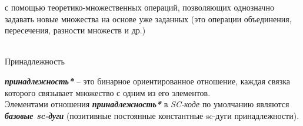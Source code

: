 \begin{frame}%
	
	\begin{textitemize}
	\item с помощью теоретико-множественных операций, позволяющих однозначно задавать новые множества на основе уже заданных (это операции объединения, пересечения, разности множеств и др.)
	\end{textitemize}

\vspace{2em}


\vspace{0.2em}
 

 
    
	\vspace{-4em}
\end{frame}

\begin{frame}{\\Принадлежность}
	\topline
	\justifying
	\begin{SCn}
	\end{SCn}
	
	\textbf{\textit{принадлежность*}} -- это бинарное ориентированное отношение, каждая связка которого связывает множество с одним из его элементов.\\
	\bigskip
	Элементами отношения \textbf{\textit{принадлежность*}} в \textit{SC-коде} по умолчанию являются \textbf{\textit{базовые sc-дуги}} (позитивные постоянные константные sc-дуги принадлежности).
\end{frame}

